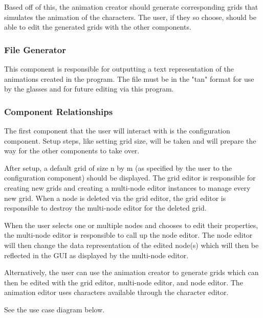 \documentclass[12pt]{article}
\begin{document}
	Based off of this, the animation creator should generate corresponding grids that simulates the animation of the characters. The user, if they so choose, should be able to edit the generated grids with the other components. 
	
	\subsubsection{File Generator}
	This component is responsible for outputting a text representation of the animations created in the program. The file must be in the "tan" format for use by the glasses and for future editing via this program.
	
	\subsubsection{Component Relationships}
	The first component that the user will interact with is the configuration component. Setup steps, like setting grid size, will be taken and will prepare the way for the other components to take over.
	
	After setup, a default grid of size n by m (as specified by the user to the configuration component) should be displayed. The grid editor is responsible for creating new grids and creating a multi-node editor instances to manage every new grid. When a node is deleted via the grid editor, the grid editor is responsible to destroy the multi-node editor for the deleted grid.
	
	When the user selects one or multiple nodes and chooses to edit their properties, the multi-node editor is responsible to call up the node editor. The node editor will then change the data representation of the edited node(s) which will then be reflected in the GUI as displayed by the multi-node editor.
	
	Alternatively, the user can use the animation creator to generate grids which can then be edited with the grid editor, multi-node editor, and node editor. The animation editor uses characters available through the character editor.
	
	See the use case diagram below.
	
\end{document}
